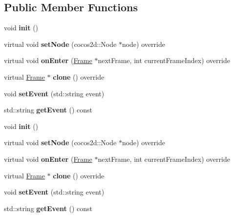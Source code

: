 \subsection*{Public Member Functions}
\begin{DoxyCompactItemize}
\item 
\mbox{\label{classEventFrame_ae5f52ac41b9a4110d5667ea64efe2dd2}} 
void {\bfseries init} ()
\item 
\mbox{\label{classEventFrame_a11abf9d05b69dda37e4a838a0374f35d}} 
virtual void {\bfseries set\+Node} (cocos2d\+::\+Node $\ast$node) override
\item 
\mbox{\label{classEventFrame_ac74f384b41326848e413985dd5bd0149}} 
virtual void {\bfseries on\+Enter} (\hyperlink{classFrame}{Frame} $\ast$next\+Frame, int current\+Frame\+Index) override
\item 
\mbox{\label{classEventFrame_a69d9c6866b0ea83cad661f3348a20310}} 
virtual \hyperlink{classFrame}{Frame} $\ast$ {\bfseries clone} () override
\item 
\mbox{\label{classEventFrame_a7fc4f38e55fdd79bf3cf6542bab3a2b2}} 
void {\bfseries set\+Event} (std\+::string event)
\item 
\mbox{\label{classEventFrame_abc9693bc6845c25b22eec93813727417}} 
std\+::string {\bfseries get\+Event} () const
\item 
\mbox{\label{classEventFrame_ae5f52ac41b9a4110d5667ea64efe2dd2}} 
void {\bfseries init} ()
\item 
\mbox{\label{classEventFrame_af7bff59be2f4e45bae04c86ce6c41bb6}} 
virtual void {\bfseries set\+Node} (cocos2d\+::\+Node $\ast$node) override
\item 
\mbox{\label{classEventFrame_a669b23436e8be6c7fe4005814f3ec356}} 
virtual void {\bfseries on\+Enter} (\hyperlink{classFrame}{Frame} $\ast$next\+Frame, int current\+Frame\+Index) override
\item 
\mbox{\label{classEventFrame_ae67cd821e870b947ce3ae5ca2bf72a2f}} 
virtual \hyperlink{classFrame}{Frame} $\ast$ {\bfseries clone} () override
\item 
\mbox{\label{classEventFrame_a7fc4f38e55fdd79bf3cf6542bab3a2b2}} 
void {\bfseries set\+Event} (std\+::string event)
\item 
\mbox{\label{classEventFrame_abc9693bc6845c25b22eec93813727417}} 
std\+::string {\bfseries get\+Event} () const
\end{DoxyCompactItemize}
